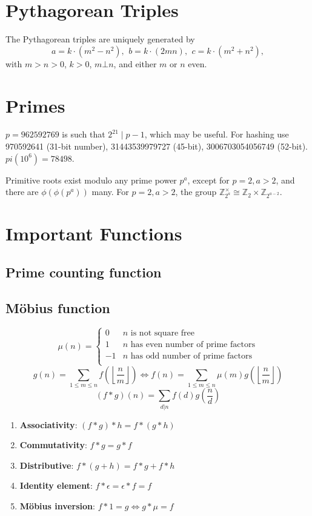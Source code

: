 \section{Pythagorean Triples}
 The Pythagorean triples are uniquely generated by
 \[ a=k\cdot (m^{2}-n^{2}),\ \,b=k\cdot (2mn),\ \,c=k\cdot (m^{2}+n^{2}), \]
 with $m > n > 0$, $k > 0$, $m \bot n$, and either $m$ or $n$ even.

\section{Primes}
	$p=962592769$ is such that $2^{21} \mid p-1$, which may be useful. For hashing
	use 970592641 (31-bit number), 31443539979727 (45-bit), 3006703054056749
	(52-bit). $pi(10^6) = 78498$.

	Primitive roots exist modulo any prime power $p^a$, except for $p = 2, a > 2$, and there are $\phi(\phi(p^a))$ many.
	For $p = 2, a > 2$, the group $\mathbb Z_{2^a}^\times \cong \mathbb Z_2 \times \mathbb Z_{2^{a-2}}$.



\section{Important Functions}
\subsection{Prime counting function}
\subsection{Möbius function}
\[
	\mu(n) = \begin{cases} 0 & n \textrm{ is not square free}\\ 1 & n \textrm{ has even number of prime factors}\\ -1 & n \textrm{ has odd number of prime factors}\\\end{cases}
\]
 \[ g(n) = \sum_{1 \leq m \leq n} f\left(\left\lfloor\frac{n}{m}\right \rfloor \right) \Leftrightarrow f(n) = \sum_{1\leq m\leq n} \mu(m)g\left(\left\lfloor\frac{n}{m}\right\rfloor\right)\]
 \[(f*g)(n)= \sum_{d|n}f(d)g\left(\frac{n}{d}\right)\]
 \begin{enumerate}
	\item \textbf{Associativity}: $(f*g)*h = f*(g*h)$
	\item \textbf{Commutativity}: $f*g = g*f$
	\item \textbf{Distributive}: $f*(g+h) = f*g + f*h$
	\item \textbf{Identity element}: $f*\epsilon = \epsilon*f=f$
	\item \textbf{Möbius inversion}: $f*1=g \iff g*\mu=f$
 \end{enumerate}

